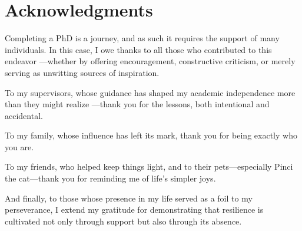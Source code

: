 \chapter*{Acknowledgments}

Completing a PhD is a journey, and as such it requires the support of many individuals. In this case, I owe thanks to all those who contributed to this endeavor —whether by offering encouragement, constructive criticism, or merely serving as unwitting sources of inspiration.  

To my supervisors, whose guidance has shaped my academic independence more than they might realize —thank you for the lessons, both intentional and accidental.  

To my family, whose influence has left its mark, thank you for being exactly who you are.  

To my friends, who helped keep things light, and to their pets—especially Pinci the cat—thank you for reminding me of life's simpler joys.  

And finally, to those whose presence in my life served as a foil to my perseverance, I extend my gratitude for demonstrating that resilience is cultivated not only through support but also through its absence.  





